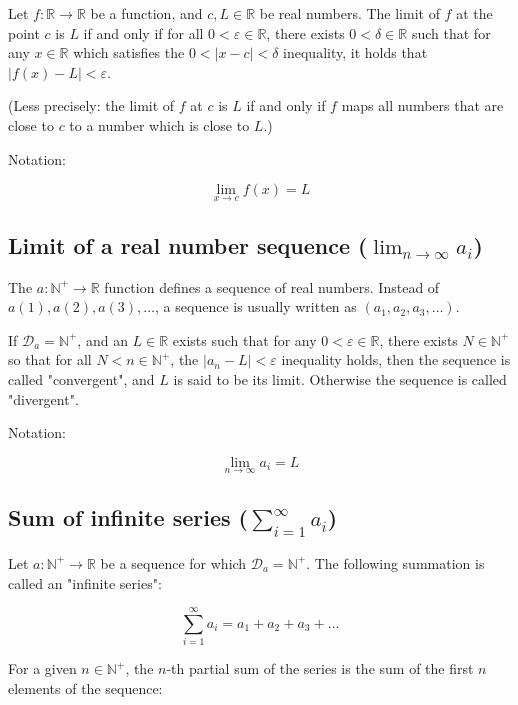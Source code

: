 \documentclass{article}
\begin{document}
        Let $f : \mathbb{R} \rightarrow \mathbb{R}$ be a function, and
        $c, L \in \mathbb{R}$ be real numbers. The limit of $f$ at the point
        $c$ is $L$ if and only if for all $0 < \varepsilon \in \mathbb{R}$,
        there exists $0 < \delta \in \mathbb{R}$ such that for any
        $x \in \mathbb{R}$ which satisfies the $0 < | x-c | < \delta$
        inequality, it holds that $| f(x) - L | < \varepsilon$.

        (Less precisely: the limit of $f$ at $c$ is $L$ if and only if $f$ maps
        all numbers that are close to $c$ to a number which is close to $L$.)

        Notation:

        $$\lim_{x \to c} f(x) = L$$

      \subsection{Limit of a real number sequence ($\lim_{n \to \infty} a_i$)}

        The $a : \mathbb{N}^+ \rightarrow \mathbb{R}$ function defines a
        sequence of real numbers. Instead of $a(1), a(2), a(3), \ldots$, a
        sequence is usually written as $(a_1, a_2, a_3, \ldots)$.

        If $\mathcal{D}_a = \mathbb{N}^+$, and an $L \in \mathbb{R}$ exists
        such that for any $0 < \varepsilon \in \mathbb{R}$, there exists
        $N \in \mathbb{N}^+$ so that for all $N < n \in \mathbb{N}^+$, the
        $|a_n - L| < \varepsilon$ inequality holds, then the sequence is called
        "convergent", and $L$ is said to be its limit. Otherwise the sequence is
        called "divergent".

        Notation:

        $$\lim_{n \to \infty} a_i = L$$

      \subsection{Sum of infinite series ($\sum_{i=1}^\infty a_i$)}

        Let $a : \mathbb{N}^+ \rightarrow \mathbb{R}$ be a sequence for which
        $\mathcal{D}_a = \mathbb{N}^+$. The following summation is called an
        "infinite series":

        $$\sum_{i=1}^\infty a_i = a_1 + a_2 + a_3 + \ldots$$

        For a given $n \in \mathbb{N}^+$, the $n$-th partial sum of the series
        is the sum of the first $n$ elements of the sequence:
\end{document}
